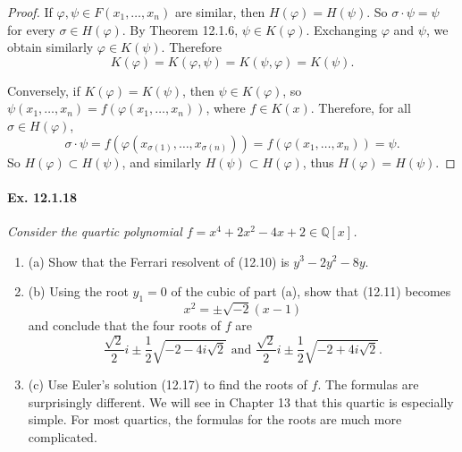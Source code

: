 \documentclass[11pt,a4paper]{article}
\newcommand{\be} {\begin{enumerate}}
\newcommand{\ee} {\end{enumerate}}
\newcommand{\Q}{\mathbb{Q}}
\begin{document}
\begin{proof}
If $\varphi,\psi \in F(x_1,\ldots,x_n)$ are similar, then $H(\varphi) = H(\psi)$. So $\sigma \cdot \psi = \psi$ for every $\sigma \in H(\varphi)$. By Theorem 12.1.6, $\psi \in K(\varphi)$. Exchanging $\varphi$ and $\psi$, we obtain similarly $\varphi \in K(\psi)$. Therefore
$$K(\varphi) = K(\varphi,\psi) = K(\psi,\varphi) = K(\psi).$$

Conversely, if $K(\varphi) = K(\psi)$, then $\psi \in K(\varphi)$, so $\psi(x_1,\ldots,x_n)  = f(\varphi(x_1,\ldots,x_n))$, where $f \in K(x)$. Therefore, for all $\sigma \in H(\varphi)$,
$$\sigma \cdot \psi = f(\varphi(x_{\sigma(1)},\ldots,x_{\sigma(n)})) = f(\varphi(x_1,\ldots,x_n)) = \psi.$$
So $H(\varphi) \subset H(\psi)$, and similarly $H(\psi) \subset H(\varphi)$, thus $H(\varphi) = H(\psi)$.
\end{proof}

\paragraph{Ex. 12.1.18}

{\it Consider the quartic polynomial $f = x^4+2x^2-4x+2\in \Q[x]$.
\be
\item[(a)] Show that the Ferrari resolvent of (12.10) is $y^3-2y^2-8y$.

\item[(b)] Using the root $y_1 = 0$ of the cubic of part (a), show that (12.11) becomes
$$x^2 = \pm \sqrt{-2}(x-1)$$
and conclude that the four roots of $f$ are
$$\frac{\sqrt{2}}{2} i \pm \frac{1}{2} \sqrt{-2-4i\sqrt{2}} \text{ and }\frac{\sqrt{2}}{2} i \pm \frac{1}{2} \sqrt{-2+4i\sqrt{2}} .$$

\item[(c)] Use Euler's solution (12.17) to find the roots of $f$. The formulas are surprisingly different. We will see in Chapter 13 that this quartic is especially simple. For most quartics, the formulas for the roots are much more complicated.
\ee
}
\end{document}
